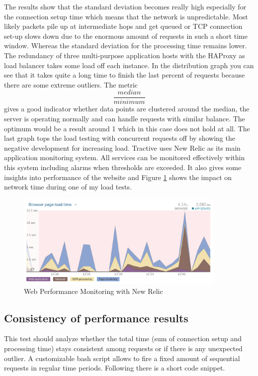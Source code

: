 The results show that the standard deviation becomes really high especially for the connection setup time which means that the network is unpredictable. Most likely packets pile up at intermediate hops and get queued or TCP connection set-up slows down due to the enormous amount of requests in such a short time window. Whereas the standard deviation for the processing time remains lower. The redundancy of three multi-purpose application hosts with the HAProxy as load balancer takes some load off each instance. In the distribution graph you can see that it takes quite a long time to finish the last percent of requests because there are some extreme outliers. The metric $$\frac{median}{minimum}$$ gives a good indicator whether data points are clustered around the median, the server is operating normally and can handle requests with similar balance. The optimum would be a result around 1 which in this case does not hold at all. The last graph tops the load testing with concurrent requests off by showing the negative development for increasing load.
Tractive uses New Relic as its main application monitoring system. All services can be monitored effectively within this system including alarms when thresholds are exceeded. It also gives some insights into performance of the website and Figure \ref{fig:newrelic2} shows the impact on network time during one of my load tests.

\begin{figure}[h]
	\centering
		\includegraphics[width=0.9\textwidth]{imgs/newrelic_load.png}
	\caption{Web Performance Monitoring with New Relic}
	\label{fig:newrelic2}
\end{figure}  

\subsection{Consistency of performance results}
This test should analyze whether the total time (sum of connection setup and processing time) stays consistent among requests or if there is any unexpected outlier. 
A customizable bash script allows to fire a fixed amount of sequential requests in regular time periods. Following there is a short code snippet.

